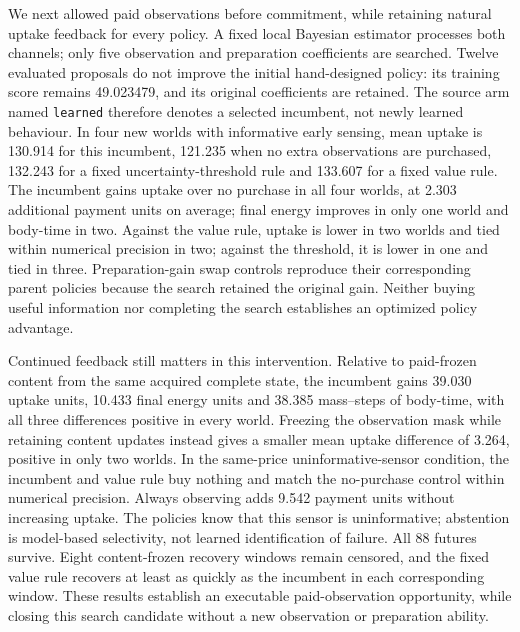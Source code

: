 We next allowed paid observations before commitment, while retaining natural uptake feedback for every policy. A fixed local Bayesian estimator processes both channels; only five observation and preparation coefficients are searched. Twelve evaluated proposals do not improve the initial hand-designed policy: its training score remains 49.023479, and its original coefficients are retained. The source arm named \texttt{learned} therefore denotes a selected incumbent, not newly learned behaviour. In four new worlds with informative early sensing, mean uptake is 130.914 for this incumbent, 121.235 when no extra observations are purchased, 132.243 for a fixed uncertainty-threshold rule and 133.607 for a fixed value rule. The incumbent gains uptake over no purchase in all four worlds, at 2.303 additional payment units on average; final energy improves in only one world and body-time in two. Against the value rule, uptake is lower in two worlds and tied within numerical precision in two; against the threshold, it is lower in one and tied in three. Preparation-gain swap controls reproduce their corresponding parent policies because the search retained the original gain. Neither buying useful information nor completing the search establishes an optimized policy advantage.

Continued feedback still matters in this intervention. Relative to paid-frozen content from the same acquired complete state, the incumbent gains 39.030 uptake units, 10.433 final energy units and 38.385 mass--steps of body-time, with all three differences positive in every world. Freezing the observation mask while retaining content updates instead gives a smaller mean uptake difference of 3.264, positive in only two worlds. In the same-price uninformative-sensor condition, the incumbent and value rule buy nothing and match the no-purchase control within numerical precision. Always observing adds 9.542 payment units without increasing uptake. The policies know that this sensor is uninformative; abstention is model-based selectivity, not learned identification of failure. All 88 futures survive. Eight content-frozen recovery windows remain censored, and the fixed value rule recovers at least as quickly as the incumbent in each corresponding window. These results establish an executable paid-observation opportunity, while closing this search candidate without a new observation or preparation ability.

